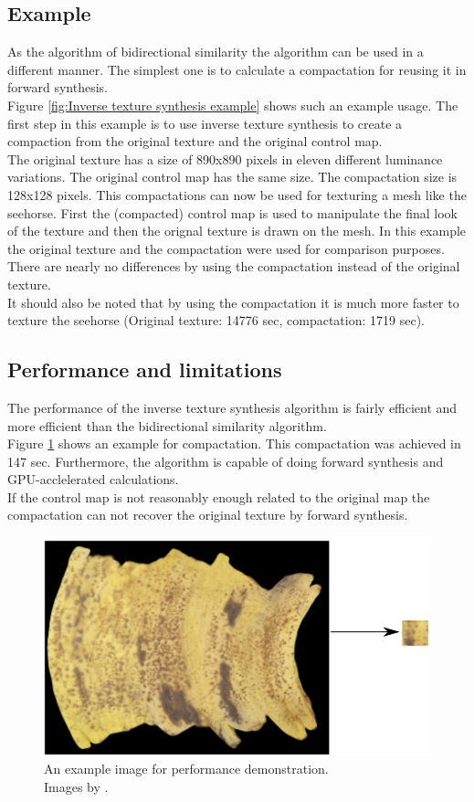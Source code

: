 \subsection{Example}
As the algorithm of bidirectional similarity the algorithm can be used in a different manner. The simplest one is to calculate a compactation for reusing it in forward synthesis.\\
Figure \ref{fig:Inverse texture synthesis example} shows such an example usage. The first step in this example is to use inverse texture synthesis to create a compaction from the original texture and the original control map.\\
The original texture has a size of 890x890 pixels in eleven different luminance variations. The original control map has the same size. The compactation size is 128x128 pixels. This compactations can now be used for texturing a mesh like the seehorse. First the (compacted) control map is used to manipulate the final look of the texture and then the orignal texture is drawn on the mesh. In this example the original texture and the compactation were used for comparison purposes. There are nearly no differences by using the compactation instead of the original texture.\\
It should also be noted that by using the compactation it is much more faster to texture the seehorse (Original texture: 14776 sec, compactation: 1719 sec).
\pagebreak

\subsection{Performance and limitations}
The performance of the inverse texture synthesis algorithm is fairly efficient and more efficient than the bidirectional similarity algorithm.\\
Figure \ref{fig:Inverse texture synthesis performance} shows an example for compactation. This compactation was achieved in 147 sec. Furthermore, the algorithm is capable of doing forward synthesis and GPU-acclelerated calculations.\\
If the control map is not reasonably enough related to the original map the compactation can not recover the original texture by forward synthesis.

\begin{figure}[h]
\centering
\includegraphics[scale=1]{img/its-banana}
\caption[Inverse texture synthesis performance]{An example image for performance demonstration.\\ Images by \cite{its}.}
\label{fig:Inverse texture synthesis performance}
\end{figure}